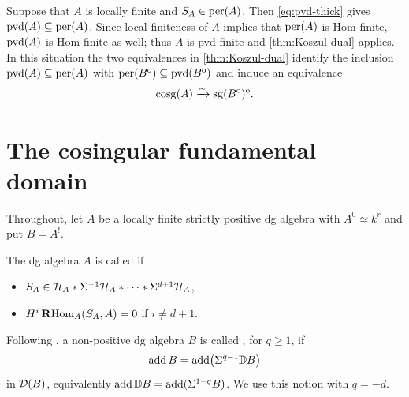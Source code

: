 \documentclass[11pt,a4paper,dvipsnames,x11names]{amsart}
\begin{document}
\begin{rmk}\label{rmk:pvd-finite}
Suppose that $A$ is locally finite and $S_A\in\operatorname{per}(A)$. Then \eqref{eq:pvd-thick} gives $\operatorname{pvd}(A)\subseteq\operatorname{per}(A)$. Since local finiteness of $A$ implies that $\operatorname{per}(A)$ is Hom-finite, $\operatorname{pvd}(A)$ is Hom-finite as well; thus $A$ is pvd-finite and \cref{thm:Koszul-dual} applies. In this situation the two equivalences in \cref{thm:Koszul-dual} identify the inclusion $\operatorname{pvd}(A)\subseteq\operatorname{per}(A)$ with $\operatorname{per}(B^{\mathrm{o}})\subseteq\operatorname{pvd}(B^{\mathrm{o}})$ and induce an equivalence
\[
\operatorname{cosg}(A)\xrightarrow{\sim}\operatorname{sg}(B^{\mathrm{o}})^{\mathrm{o}}.
\]
\end{rmk}

\section{The cosingular fundamental domain}\label{sec:cosingular-fundamental-domain}

Throughout, let $A$ be a locally finite strictly positive dg algebra with $A^0\simeq k^r$ and put $B=A^!$.

\begin{dfn}\label{dfn:d-stable}
The dg algebra $A$ is called  if
\begin{itemize}
\item [(i)] $S_A\in\mathcal H_A\ast\Sigma^{-1}\mathcal H_A\ast\cdots\ast\Sigma^{d+1}\mathcal H_A$,
\item [(ii)] $H^i\operatorname{\mathbf{R}Hom}_A(S_A,A)=0$ if $i\neq d+1$.
\end{itemize}
\end{dfn}

Following \cite[Definition~2.2]{Jin20}, a non-positive dg algebra $B$ is called , for $q\geq1$, if
\[
\operatorname{add} B=\operatorname{add}\bigl(\Sigma^{q-1}\mathbb D B\bigr)
\]
in $\mathcal D(B)$, equivalently $\operatorname{add}\mathbb D B=\operatorname{add}(\Sigma^{1-q}B)$. We use this notion with $q=-d$.
\end{document}

